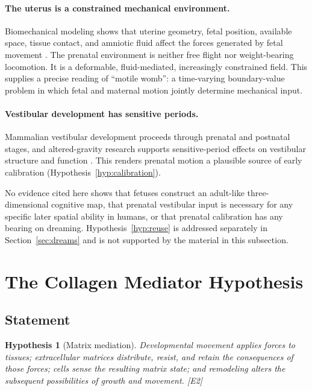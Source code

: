 \documentclass[11pt,a4paper]{article}
\theoremstyle{plain}
\newtheorem{hypothesis}{Hypothesis}[section]
\theoremstyle{definition}
\theoremstyle{remark}
\newcommand{\tier}[1]{\textup{\textsc{[#1]}}}
\newcommand{\Etwo}{\tier{E2}}
\begin{document}
\paragraph{The uterus is a constrained mechanical environment.} Biomechanical modeling shows that uterine geometry, fetal position, available space, tissue contact, and amniotic fluid affect the forces generated by fetal movement \cite{verbruggen2016}. The prenatal environment is neither free flight nor weight-bearing locomotion. It is a deformable, fluid-mediated, increasingly constrained field. This supplies a precise reading of ``motile womb'': a time-varying boundary-value problem in which fetal and maternal motion jointly determine mechanical input.

\paragraph{Vestibular development has sensitive periods.} Mammalian vestibular development proceeds through prenatal and postnatal stages, and altered-gravity research supports sensitive-period effects on vestibular structure and function \cite{jamon2014}. This renders prenatal motion a plausible source of early calibration (Hypothesis~\ref{hyp:calibration}).

\begin{caution}
No evidence cited here shows that fetuses construct an adult-like three-dimensional cognitive map, that prenatal vestibular input is necessary for any specific later spatial ability in humans, or that prenatal calibration has any bearing on dreaming. Hypothesis~\ref{hyp:reuse} is addressed separately in Section~\ref{sec:dreams} and is not supported by the material in this subsection.
\end{caution}

\section{The Collagen Mediator Hypothesis}\label{sec:mediator}

\subsection{Statement}

\begin{hypothesis}[Matrix mediation]\label{hyp:mediation}
Developmental movement applies forces to tissues; extracellular matrices distribute, resist, and retain the consequences of those forces; cells sense the resulting matrix state; and remodeling alters the subsequent possibilities of growth and movement. \Etwo
\end{hypothesis}
\end{document}
